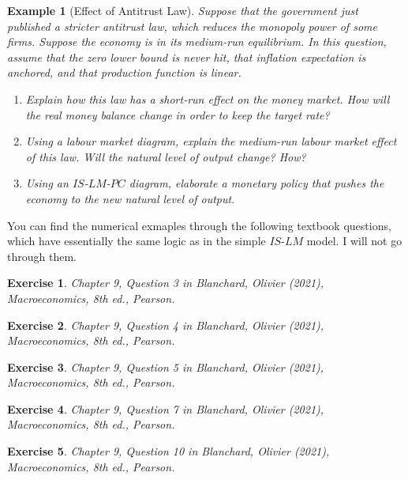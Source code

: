 \documentclass[12pt]{article}
\newtheorem{example}{Example}
\newtheorem{exercise}{Exercise}
\begin{document}
\begin{example}[Effect of Antitrust Law]
  Suppose that the government just published a stricter antitrust law, which reduces the monopoly power of some firms. Suppose the economy is in its medium-run equilibrium. In this question, assume that the zero lower bound is never hit, that inflation expectation is anchored, and that production function is linear.
  \begin{enumerate}
    \item Explain how this law has a short-run effect on the money market. How will the real money balance change in order to keep the target rate?
    \vspace{80pt}
    \item Using a labour market diagram, explain the medium-run labour market effect of this law. Will the natural level of output change? How?
    \vspace{80pt}
    \item Using an $IS$-$LM$-$PC$ diagram, elaborate a monetary policy that pushes the economy to the new natural level of output. 
    \vspace{180pt}
  \end{enumerate}
\end{example}


You can find the numerical exmaples through the following textbook questions, which have essentially the same logic as in the simple $IS$-$LM$ model. I will not go through them.

\begin{exercise}
  Chapter 9, Question 3 in Blanchard, Olivier (2021), \textit{Macroeconomics}, 8th ed., Pearson.
\end{exercise}

\begin{exercise}
  Chapter 9, Question 4 in Blanchard, Olivier (2021), \textit{Macroeconomics}, 8th ed., Pearson.
\end{exercise}

\begin{exercise}
  Chapter 9, Question 5 in Blanchard, Olivier (2021), \textit{Macroeconomics}, 8th ed., Pearson.
\end{exercise}

\begin{exercise}
  Chapter 9, Question 7 in Blanchard, Olivier (2021), \textit{Macroeconomics}, 8th ed., Pearson.
\end{exercise}

\begin{exercise}
  Chapter 9, Question 10 in Blanchard, Olivier (2021), \textit{Macroeconomics}, 8th ed., Pearson.
\end{exercise}
\end{document}

